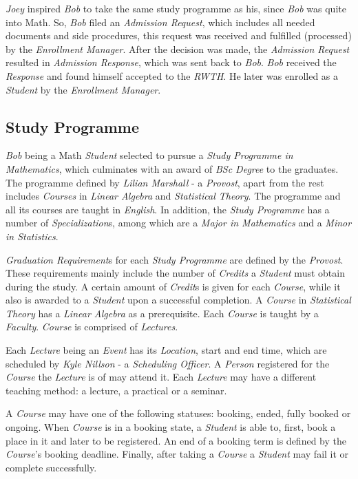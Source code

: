\documentclass{article}    %
\begin{document}
\textit{Joey} inspired \textit{Bob} to take the same study programme as his, since \textit{Bob} was quite into Math. So, \textit{Bob} filed an \textit{Admission Request}, which includes all needed documents and side procedures, this request was received and fulfilled (processed) by the \textit{Enrollment Manager}. After the decision was made, the \textit{Admission Request} resulted in \textit{Admission Response}, which was sent back to \textit{Bob}. \textit{Bob} received the \textit{Response} and found himself accepted to the \textit{RWTH}. He later was enrolled as a \textit{Student} by the \textit{Enrollment Manager}. 
% 
\subsection{Study Programme}
%
\textit{Bob} being a Math \textit{Student} selected to pursue a \textit{Study Programme in Mathematics}, which culminates with an award of \textit{BSc Degree} to the graduates. The programme defined by \textit{Lilian Marshall} - a \textit{Provost}, apart from the rest includes \textit{Courses} in \textit{Linear Algebra} and \textit{Statistical Theory}. The programme and all its courses are taught in \textit{English}. In addition, the \textit{Study Programme} has a number of \textit{Specialization}s, among which are a \textit{Major in Mathematics} and a \textit{Minor in Statistics}.

\textit{Graduation Requirement}s for each \textit{Study Programme} are defined by the \textit{Provost}. These requirements mainly include the number of \textit{Credits} a \textit{Student} must obtain during the study. A certain amount of \textit{Credit}s is given for each \textit{Course}, while it also is awarded to a \textit{Student} upon a successful completion. A \textit{Course} in \textit{Statistical Theory} has a \textit{Linear Algebra} as a prerequisite. Each \textit{Course} is taught by a \textit{Faculty}. \textit{Course} is comprised of \textit{Lectures}.

Each \textit{Lecture} being an \textit{Event} has its \textit{Location}, start and end time, which are scheduled by \textit{Kyle Nillson} - a \textit{Scheduling Officer}. A \textit{Person} registered for the \textit{Course} the \textit{Lecture} is of may attend it. Each \textit{Lecture} may have a different teaching method: a lecture, a practical or a seminar.

A \textit{Course} may have one of the following statuses: booking, ended, fully booked or ongoing. When \textit{Course} is in a booking state, a \textit{Student} is able to, first, book a place in it and later to be registered. An end of a booking term is defined by the \textit{Course}'s booking deadline. Finally, after taking a \textit{Course} a \textit{Student} may fail it or complete successfully.
\end{document}
